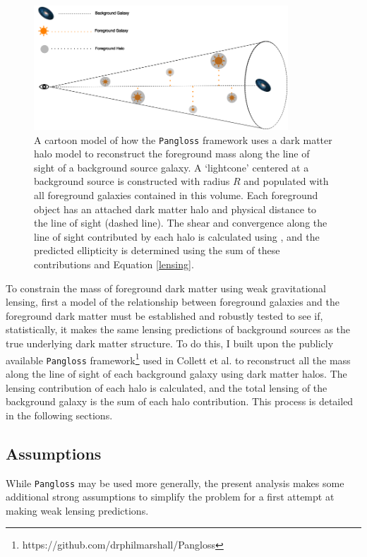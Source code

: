 \documentclass[%
 reprint,
 amsmath,amssymb,
 aps,nofootinbib
]{revtex4-1}
\begin{document}
\begin{figure}
    \centering
    \includegraphics[width=0.85\textwidth]{figs-swe/pangloss_cartoon.png}
    \captionsetup{justification=raggedright,singlelinecheck=false}
    \caption{A cartoon model of how the \texttt{Pangloss} framework uses a dark matter halo model to reconstruct the foreground mass along the line of sight of a background source galaxy. A `lightcone' centered at a background source is constructed with radius $R$ and populated with all foreground galaxies contained in this volume. Each foreground object has an attached dark matter halo and physical distance to the line of sight (dashed line). The shear and convergence along the line of sight contributed by each halo is calculated using \cite{lensing_calc}, and the predicted ellipticity is determined using the sum of these contributions and Equation \eqref{lensing}.}
    \label{pangloss_cartoon}
\end{figure}

To constrain the mass of foreground dark matter using weak gravitational lensing, first a model of the relationship between foreground galaxies and the foreground dark matter must be established and robustly tested to see if, statistically, it makes the same lensing predictions of background sources as the true underlying dark matter structure. To do this, I built upon the publicly available \texttt{Pangloss} framework\footnote{\label{note1}https://github.com/drphilmarshall/Pangloss} used in Collett et al. \cite{collett_marshall} to reconstruct all the mass along the line of sight of each background galaxy using dark matter halos. The lensing contribution of each halo is calculated, and the total lensing of the background galaxy is the sum of each halo contribution. This process is detailed in the following sections.

\subsection*{Assumptions}
While \texttt{Pangloss} may be used more generally, the present analysis makes some additional strong assumptions to simplify the problem for a first attempt at making weak lensing predictions.
\end{document}
